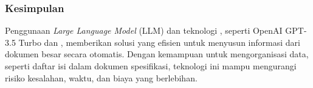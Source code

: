 \subsubsection{Kesimpulan}

Penggunaan \emph{Large Language Model} (LLM) dan teknologi \cv, seperti OpenAI GPT-3.5 Turbo dan \donut, memberikan solusi yang efisien untuk menyusun informasi dari dokumen besar secara otomatis. Dengan kemampuan untuk mengorganisasi data, seperti daftar isi dalam dokumen spesifikasi, teknologi ini mampu mengurangi risiko kesalahan, waktu, dan biaya yang berlebihan. 
